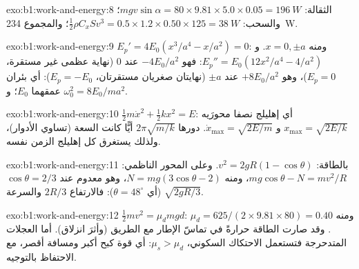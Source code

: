 \begin{solution}{exo:b1:work-and-energy:8}
الثقالة: $mgv\sin\alpha = 80 \times 9.81 \times 5.0 \times 0.05 = \qty{196}{W}$؛
والسحب: $\tfrac12\rho C_xSv^3 = 0.5 \times 1.2 \times 0.50 \times 125 =
\qty{38}{W}$؛ والمجموع \qty{234}{W}.
\end{solution}

\begin{solution}{exo:b1:work-and-energy:9}
$E_p' = 4E_0(x^3/a^4 - x/a^2) = 0$: ومنه $x = 0, \pm a$. و $E_p'' = E_0(12x^2/a^4 -
4/a^2)$: فهو $-4E_0/a^2$ عند $0$ (نهاية عظمى غير مستقرة، $E_p = 0$)، وهو $+8E_0/a^2$
عند $\pm a$ (نهايتان صغريان مستقرتان، $E_p = -E_0$): أي بئران عمقهما $E_0$؛
و $\omega_0^2 = 8E_0/ma^2$.
\end{solution}

\begin{solution}{exo:b1:work-and-energy:10}
$\tfrac12 m\dot x^2 + \tfrac12 kx^2 = E$: أي إهليلج نصفا محورَيه $x_{\max}
= \sqrt{2E/k}$ و $\dot x_{\max} = \sqrt{2E/m}$. 
دورها $2\pi\sqrt{m/k}$ أيًّا كانت السعة (تساوي الأدوار)، ولذلك
يستغرق كل إهليلج الزمن نفسه.
\end{solution}

\begin{solution}{exo:b1:work-and-energy:11}
بالطاقة: $v^2 = 2gR(1 - \cos\theta)$. وعلى المحور الناظمي: $mg\cos\theta - N = mv^2/R$،
ومنه $N = mg(3\cos\theta - 2)$، وهو معدوم عند $\cos\theta = 2/3$ (أي $\theta =
48^\circ$): فالارتفاع $2R/3$ والسرعة $\sqrt{2gR/3}$.
\end{solution}

\begin{solution}{exo:b1:work-and-energy:12}
$\tfrac12 mv^2 = \mu_dmgd$: ومنه $\mu_d = 625/(2 \times 9.81 \times 80) = 0.40$.
وقد صارت الطاقة حرارةً في تماسّ الإطار مع الطريق (وأثرَ انزلاق). أما العجلات
المتدحرجة فتستعمل الاحتكاك السكوني، $\mu_s > \mu_d$: أي قوة كبح أكبر ومسافة
أقصر، مع الاحتفاظ بالتوجيه.
\end{solution}

